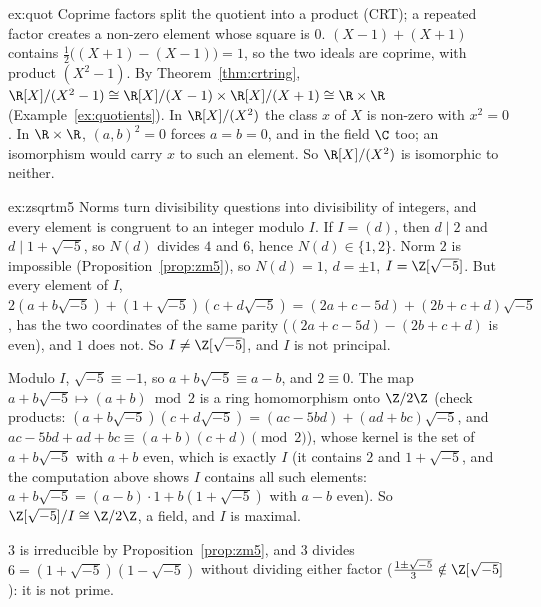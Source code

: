 \begin{solution}{ex:quot}
\idea Coprime factors split the quotient into a product (CRT); a repeated factor creates a non-zero element whose square is $0$.
\writeup $(X-1)+(X+1)$ contains $\frac12\bigl((X+1)-(X-1)\bigr)=1$, so the two ideals are coprime, with product $(X^2-1)$. By Theorem~\ref{thm:crtring}, $\R[X]/(X^2-1)\cong\R[X]/(X-1)\times\R[X]/(X+1)\cong\R\times\R$ (Example~\ref{ex:quotients}). In $\R[X]/(X^2)$ the class $x$ of $X$ is non-zero with $x^2=0$. In $\R\times\R$, $(a,b)^2=0$ forces $a=b=0$, and in the field $\C$ too; an isomorphism would carry $x$ to such an element. So $\R[X]/(X^2)$ is isomorphic to neither.
\end{solution}

\begin{solution}{ex:zsqrtm5}
\idea Norms turn divisibility questions into divisibility of integers, and every element is congruent to an integer modulo $I$.
\writeup If $I=(d)$, then $d\mid2$ and $d\mid1+\sqrt{-5}$, so $N(d)$ divides $4$ and $6$, hence $N(d)\in\{1,2\}$. Norm $2$ is impossible (Proposition~\ref{prop:zm5}), so $N(d)=1$, $d=\pm1$, $I=\Z[\sqrt{-5}]$. But every element of $I$, $2(a+b\sqrt{-5})+(1+\sqrt{-5})(c+d\sqrt{-5})=(2a+c-5d)+(2b+c+d)\sqrt{-5}$, has the two coordinates of the same parity ($(2a+c-5d)-(2b+c+d)$ is even), and $1$ does not. So $I\ne\Z[\sqrt{-5}]$, and $I$ is not principal.

Modulo $I$, $\sqrt{-5}\equiv-1$, so $a+b\sqrt{-5}\equiv a-b$, and $2\equiv0$. The map $a+b\sqrt{-5}\mapsto(a+b)\bmod2$ is a ring homomorphism onto $\Z/2\Z$ (check products: $(a+b\sqrt{-5})(c+d\sqrt{-5})=(ac-5bd)+(ad+bc)\sqrt{-5}$, and $ac-5bd+ad+bc\equiv(a+b)(c+d)\pmod2$), whose kernel is the set of $a+b\sqrt{-5}$ with $a+b$ even, which is exactly $I$ (it contains $2$ and $1+\sqrt{-5}$, and the computation above shows $I$ contains all such elements: $a+b\sqrt{-5}=(a-b)\cdot1+b(1+\sqrt{-5})$ with $a-b$ even). So $\Z[\sqrt{-5}]/I\cong\Z/2\Z$, a field, and $I$ is maximal.

$3$ is irreducible by Proposition~\ref{prop:zm5}, and $3$ divides $6=(1+\sqrt{-5})(1-\sqrt{-5})$ without dividing either factor ($\frac{1\pm\sqrt{-5}}3\notin\Z[\sqrt{-5}]$): it is not prime.
\end{solution}

